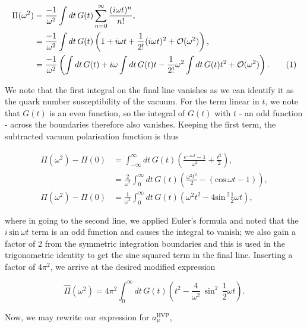 \documentclass{article}
\numberwithin{equation}{section} %
\begin{document}
\begin{align*}
\Pi(\omega^2)&= \frac{-1}{\omega^2}\int dt \, G(t) \sum_{n=0}^\infty \frac{(i\omega t)^n}{n!},\\
&= \frac{-1}{\omega^2}\int dt \, G(t) \left(1 +i\omega t+\frac{1}{2!}(i\omega t)^2 + \mathcal{O}(\omega^2) \right),\\
&= \frac{-1}{\omega^2} \left(\int dt \, G(t) + i\omega \int dt \, G(t)t-\frac{1}{2!}\omega^2 \int dt \, G(t)t^2 + \mathcal{O}(\omega^2) \right).
\tag{\refstepcounter{equation}\theequation}
\end{align*}

\noindent We note that the first integral on the final line vanishes as we can identify it as the quark number susceptibility of the vacuum. For the term linear in $t$, we note that $G(t)$ is an even function, so the integral of $G(t)$ with $t$ - an odd function - across the boundaries therefore also vanishes. Keeping the first term, the subtracted vacuum polarisation function is thus

\begin{equation}
\begin{split}
\Pi(\omega^2)-\Pi(0) &= \int^\infty_{-\infty} dt \, G(t) \left( \frac{e^{-i\omega t} - 1}{\omega^2} + \frac{t^2}{2}\right),\\
&=\frac{2}{\omega^2}\int^\infty_0dt \, G(t) \left( \frac{\omega^2t^2}{2}-(\mathrm{cos\,} \omega t- 1) \right),\\
\Pi(\omega^2)-\Pi(0) &=\frac{1}{\omega^2}\int^\infty_0dt \, G(t) \left( \omega^2t^2-4\mathrm{sin\,}^2 \frac{1}{2}\omega t \right),
\end{split}
\end{equation}

\noindent where in going to the second line, we applied Euler's formula and noted that the $i\, \mathrm{sin\,}\omega t$ term is an odd function and causes the integral to vanish; we also gain a factor of 2 from the symmetric integration boundaries and this is used in the trigonometric identity to get the sine squared term in the final line. Inserting a factor of $4\pi^2$, we arrive at the desired modified expression

\begin{equation}
\hat{\Pi}(\omega^2) = 4\pi^2\int^\infty_0 dt\, G(t) \left( t^2-\frac{4}{\omega^2}\,\sin^2\, \frac{1}{2}\omega t \right).
\end{equation}

Now, we may rewrite our expression for $a_\mu^\mathrm{HVP}$,
\end{document}
